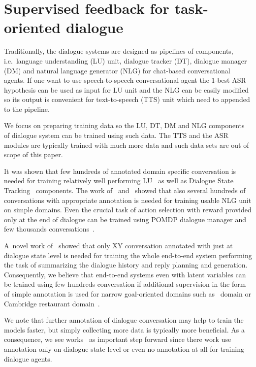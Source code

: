 \documentclass[runningheads,a4paper]{llncs}
\begin{document}
\section{Supervised feedback for task-oriented dialogue}
\label{sec:repre}
Traditionally, the dialogue systems are designed as pipelines of components, i.e.\ language understanding (LU) unit, dialogue tracker (DT), dialogue manager (DM) and natural language generator (NLG) for chat-based conversational agents.
If one want to use speech-to-speech conversational agent the 1-best ASR hypothesis can be used as input for LU unit and the NLG can be easily modified so its output is convenient for text-to-speech (TTS) unit which need to appended to the pipeline.

We focus on preparing training data so the LU, DT, DM and NLG components of dialogue system can be trained using such data.
The TTS and the ASR modules are typically trained with much more data and such data sets are out of scope of this paper.

It was shown that few hundreds of annotated domain specific conversation is needed for training relatively well performing LU~\cite{duvsek2014alex} as well as Dialogue State Tracking~\cite{young2010hidden} components.
The work of~\cite{duvsek2014alex} and~\cite{mairesse2010phrase} showed that also several hundreds of conversations with appropriate annotation is needed for training usable NLG unit on simple domains.
Even the crucial task of action selection with reward provided only at the end of dialogue can be trained using POMDP dialogue manager and few thousands conversations~\cite{gasic2011line}.

A~novel work of~\cite{wen2016network} showed that only XY conversation annotated with just at dialogue state level is needed for training the whole end-to-end system performing the task of summarizing the dialogue history and reply planning and generation.
Consequently, we believe that end-to-end systems even with latent variables can be trained using few hundreds conversation if additional supervision in the form of simple annotation is used for narrow goal-oriented domains such as~\cite{wen2016network} domain or Cambridge restaurant domain~\cite{henderson2014dstc2}.

We note that further annotation of dialogue conversation may help to train the models faster, but simply collecting more data is typically more beneficial.
As a consequence, we see works~\cite{wen2016network,bordes2016learning,williams2016end} as important step forward since there work use annotation only on dialogue state level or even no annotation at all for training dialogue agents.
\end{document}
